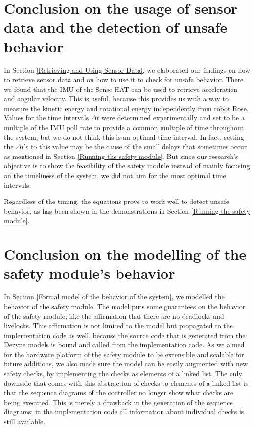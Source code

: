 \documentclass[12pt]{scrreprt}
\begin{document}
\section{Conclusion on the usage of sensor data and the detection of unsafe behavior}
In Section \ref{Retrieving and Using Sensor Data}, we elaborated our findings on how to retrieve sensor data and on how to use it to check for unsafe behavior. There we found that the IMU of the Sense HAT can be used to retrieve acceleration and angular velocity. This is useful, because this provides us with a way to measure the kinetic energy and rotational energy independently from robot Rose. Values for the time intervals $\Delta t$ were determined experimentally and set to be a multiple of the IMU poll rate to provide a common multiple of time throughout the system, but we do not think this is an optimal time interval. In fact, setting the $\Delta t$'s to this value may be the cause of the small delays that sometimes occur as mentioned in Section \ref{Running the safety module}. But since our research's objective is to show the feasibility of the safety module instead of mainly focusing on the timeliness of the system, we did not aim for the most optimal time intervals.
\par
Regardless of the timing, the equations prove to work well to detect unsafe behavior, as has been shown in the demonstrations in Section \ref{Running the safety module}. 


\section{Conclusion on the modelling of the safety module's behavior}
\label{On modelling safety module behavior}
In Section \ref{Formal model of the behavior of the system}, we modelled the behavior of the safety module. The model puts some guarantees on the behavior of the safety module; like the affirmation that there are no deadlocks and livelocks. This affirmation is not limited to the model but propagated to the implementation code as well, because the source code that is generated from the Dezyne models is bound and called from the implementation code. As we aimed for the hardware platform of the safety module to be extensible and scalable for future additions, we also made sure the model can be easily augmented with new safety checks, by implementing the checks as elements of a linked list. The only downside that comes with this abstraction of checks to elements of a linked list is that the sequence diagrams of the controller no longer show what checks are being executed. This is merely a drawback in the generation of the sequence diagrams; in the implementation code all information about individual checks is still available.
\end{document}
